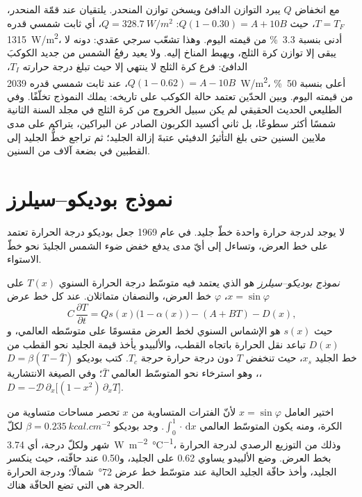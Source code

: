 
مع انخفاض $Q$ يبرد التوازن الدافئ ويسخن توازن المنحدر.
يلتقيان عند قمّة المنحدر، $T = T_F$، حيث $Q(1 - 0.30) = A +
10B$: $Q = \qty{328.7}{W/m^2}$، أي ثابت شمسي قدره \qty{1315}{W/m^2}،
أدنى بنسبة \qty{3.3}{\percent} من قيمته اليوم. وهذا تشعّب سرجي عقدي: دونه
لا يبقى إلا توازن كرة الثلج، ويهبط المناخ إليه.
ولا يعيد رفعُ الشمس من جديد الكوكبَ الدافئ: فرع كرة الثلج
لا ينتهي إلا حيث تبلغ درجة حرارته $T_I$، $Q(1 - 0.62) = A -
10B$، عند ثابت شمسي قدره \qty{2039}{W/m^2}، أعلى بنسبة \qty{50}{\percent} من
قيمته اليوم. وبين الحدّين تعتمد حالة الكوكب على تاريخه:
يملك النموذج تخلّفًا. وفي الطليعي الحديث الحقيقي لم يكن سبيل الخروج من
كرة الثلج في مجلد السنة الثانية شمسًا أكثر سطوعًا، بل ثاني أكسيد الكربون
الصادر عن البراكين، يتراكم على مدى ملايين السنين حتى بلغ
التأثيرُ الدفيئي عتبةَ إزالة الجليد؛ ثم تراجع خطُّ الجليد
إلى القطبين في بضعة آلاف من السنين.

\section{نموذج بوديكو--سيلرز}\label{sec:b3:climate-models:budyko-sellers}

لا يوجد لدرجة حرارة واحدة خطّ جليد. في عام 1969 جعل بوديكو درجة الحرارة
تعتمد على خط العرض، وتساءل إلى أيّ مدى يدفع خفض ضوء الشمس
الجليدَ نحو خطّ الاستواء.

\begin{definition}\label{def:b3:climate-models:budyko-sellers}
\emph{نموذج بوديكو--سيلرز} هو  الذي يعتمد فيه متوسّط درجة الحرارة السنوي $T(x)$ على
$x = \sin\varphi$، $\varphi$ خط العرض، والنصفان متماثلان.
عند كل خط عرض
\[
C\,\frac{\partial T}{\partial t} = Qs(x)\big(1 - \alpha(x)\big) - (A + BT) - D(x) ,
\]
حيث $s(x)$ هو الإشماس السنوي لخط العرض مقسومًا على
متوسّطه العالمي، و$D(x)$ تباعد نقل الحرارة باتجاه القطب، والألبيدو
يأخذ قيمة الجليد نحو القطب من خط الجليد $x_s$، حيث تنخفض $T$ دون
درجة حرارة حرجة $T_c$. كتب بوديكو $D = \beta(T - \bar T)$، وهو
استرخاء نحو المتوسّط العالمي $\bar T$؛ وفي الصيغة الانتشارية، $D =
-\mathcal D\,\partial_x\big[(1 - x^2)\,\partial_xT\big]$.
\end{definition}

اختير العامل $x = \sin\varphi$ لأنّ الفترات المتساوية من $x$ تحصر
مساحات متساوية من الكرة، ومنه يكون المتوسّط العالمي $\int_0^1\cdot\,\mathrm
dx$. وجد بوديكو $\beta = \qty{0.235}{kcal.cm^{-2}}$ لكلّ شهر ولكلّ
درجة، أي \qty{3.74}{W.m^{-2}.\celsius^{-1}}، وذلك من التوزيع الرصدي
لدرجة الحرارة بخط العرض. وضع الألبيدو يساوي 0.62 على الجليد، و0.50 عند حافّته،
حيث ينكسر الجليد، وأخذ حافّة الجليد الحالية عند متوسّط خط عرض
\ang{72}~شمالًا؛ ودرجة الحرارة الحرجة هي التي تضع الحافّة
هناك.

